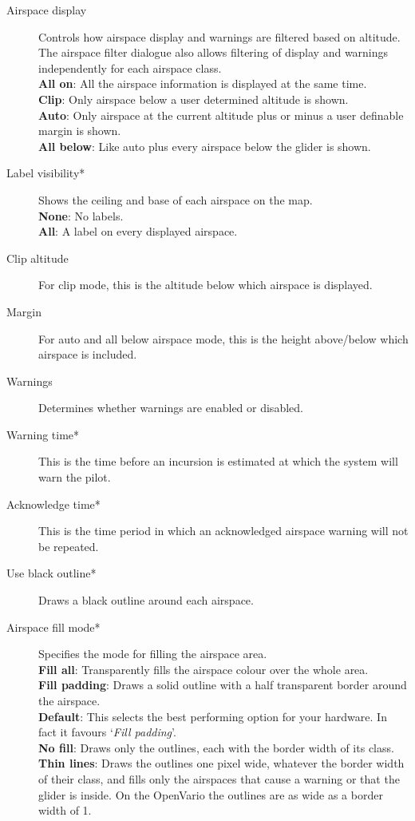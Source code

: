 \begin{description}
\item[Airspace display]  Controls how airspace display and warnings are filtered 
  based on altitude.  The airspace filter dialogue also allows filtering
  of display and warnings independently for each airspace class. \\
  {\bf All on}: All the airspace information is displayed at the same time. \\
  {\bf Clip}: Only airspace below a user determined altitude is shown. \\
  {\bf Auto}: Only airspace at the current altitude plus or minus a user 
    definable margin is shown.
 \\
  {\bf All below}:  Like auto plus every airspace below the glider is shown.
\item[Label visibility*]  Shows the ceiling and base of each airspace
  on the map. \\
  {\bf None}:  No labels. \\
  {\bf All}:  A label on every displayed airspace.
\item[Clip altitude] For clip mode, this is the altitude below which airspace 
  is displayed.
\item[Margin]  For auto and all below airspace mode, this is the height 
  above/below which airspace is included.
\item[Warnings]  Determines whether warnings are enabled or disabled.
\item[Warning time*]  This is the time before an incursion is estimated at
  which the system will warn the pilot.
\item[Acknowledge time*]  This is the time period in which an acknowledged airspace 
  warning will not be repeated.
\item[Use black outline*]  Draws a black outline around each airspace.
\item[Airspace fill mode*]  Specifies the mode for filling the airspace area. \\
  {\bf Fill all}:  Transparently fills the airspace colour over the whole area. \\
  {\bf Fill padding}: Draws a solid outline with a half transparent border 
    around the airspace. \\
  {\bf Default}:  This selects the best performing option for your hardware. In fact 
    it favours `{\it Fill padding}'. \\
  {\bf No fill}: Draws only the outlines, each with the border width of
    its class. \\
  {\bf Thin lines}: Draws the outlines one pixel wide, whatever the
    border width of their class, and fills only the airspaces that
    cause a warning or that the glider is inside.  On the OpenVario the
    outlines are as wide as a border width of 1.
\end{description}

